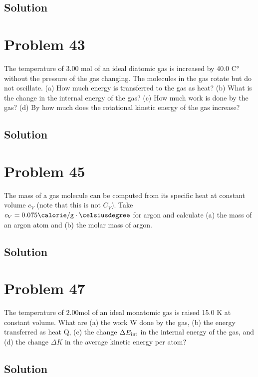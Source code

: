 \documentclass[12pt]{article}
\begin{document}
        \subsection{Solution}

    \pagebreak
    \section{Problem 43}
        The temperature of 3.00 mol of an ideal diatomic gas is increased by 40.0 C° without the pressure of the gas changing.
        The molecules in the gas rotate but do not oscillate. 
        (a) How much energy is transferred to the gas as heat? 
        (b) What is the change in the internal energy of the gas? 
        (c) How much work is done by the gas? 
        (d) By how much does the rotational kinetic energy of the gas increase?

        \subsection{Solution}

    \pagebreak
    \section{Problem 45}
        The mass of a gas molecule can be computed from its specific heat at constant volume $c_V$ (note that this is not $C_V$). 
        Take $c_V = 0.075 \unit{\calorie/\gram\cdot\celsiusdegree}$ for argon and calculate (a) the mass of an argon atom and (b) the molar mass of argon.

        \subsection{Solution}

    \pagebreak
    \section{Problem 47}
        The temperature of $2.00 \unit{\mole}$ of an ideal monatomic gas is raised 15.0 K at constant volume. 
        What are (a) the work W done by the gas, (b) the energy transferred as heat Q, (c) the change $\Delta E_{\rm int}$ in the internal energy of the gas, and (d) the change $\Delta K$ in the average kinetic energy per atom?

        \subsection{Solution}
\end{document}
